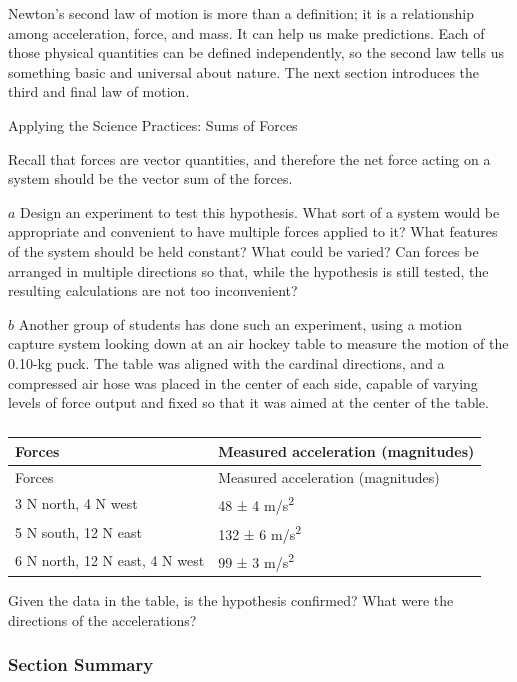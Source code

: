 \documentclass[
]{book}
\newenvironment{note}{}{}
\begin{document}
Newton's second law of motion is more than a definition; it is a
relationship among acceleration, force, and mass. It can help us make
predictions. Each of those physical quantities can be defined
independently, so the second law tells us something basic and universal
about nature. The next section introduces the third and final law of
motion.

\hypertarget{fs-id1660804}{}
\begin{note}

Applying the Science Practices: Sums of Forces

Recall that forces are vector quantities, and therefore the net force
acting on a system should be the vector sum of the forces.

\(a\) Design an experiment to test this hypothesis. What sort of a
system would be appropriate and convenient to have multiple forces
applied to it? What features of the system should be held constant? What
could be varied? Can forces be arranged in multiple directions so that,
while the hypothesis is still tested, the resulting calculations are not
too inconvenient?

\(b\) Another group of students has done such an experiment, using a
motion capture system looking down at an air hockey table to measure the
motion of the 0.10-kg puck. The table was aligned with the cardinal
directions, and a compressed air hose was placed in the center of each
side, capable of varying levels of force output and fixed so that it was
aimed at the center of the table.

\begin{longtable}[]{@{}ll@{}}
\caption{{}}\tabularnewline
\toprule
Forces & Measured acceleration (magnitudes)\tabularnewline
\midrule
\endfirsthead
\toprule
Forces & Measured acceleration (magnitudes)\tabularnewline
\midrule
\endhead
3 N north, 4 N west & 48 ± 4 m/s\textsuperscript{2}\tabularnewline
5 N south, 12 N east & 132 ± 6 m/s\textsuperscript{2}\tabularnewline
6 N north, 12 N east, 4 N west & 99 ± 3 m/s\textsuperscript{2}\tabularnewline
\bottomrule
\end{longtable}

Given the data in the table, is the hypothesis confirmed? What were the
directions of the accelerations?

\end{note}

\hypertarget{fs-id2691902-summary}{}
\hypertarget{section-summary-10}{%
\subsubsection{Section Summary}\label{section-summary-10}}
\end{document}
